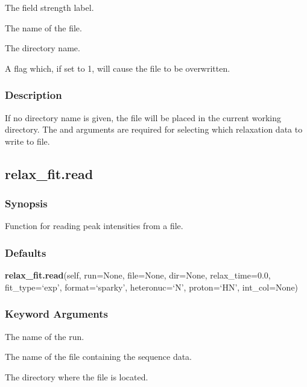   The field strength label. 

  The name of the file. 

  The directory name. 

  A flag which, if set to 1, will cause the file to be overwritten. 




\subsubsection{Description}

If no directory name is given, the file will be placed in the current working directory. The  and  arguments are required for selecting which relaxation data to write to file.




\newpage

\subsection{relax\_fit.read}


\subsubsection{Synopsis}

Function for reading peak intensities from a file.



\subsubsection{Defaults}

\textsf{\textbf{relax\_fit.read}(self, run=None, file=None, dir=None, relax\_time=0.0, fit\_type=`exp', format=`sparky', heteronuc=`N', proton=`HN', int\_col=None)}


\subsubsection{Keyword Arguments}

  The name of the run. 

  The name of the file containing the sequence data. 

  The directory where the file is located. 

